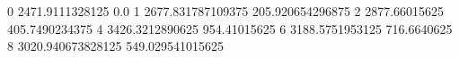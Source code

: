 0 2471.9111328125 0.0
1 2677.831787109375 205.920654296875
2 2877.66015625 405.7490234375
4 3426.3212890625 954.41015625
6 3188.5751953125 716.6640625
8 3020.940673828125 549.029541015625
